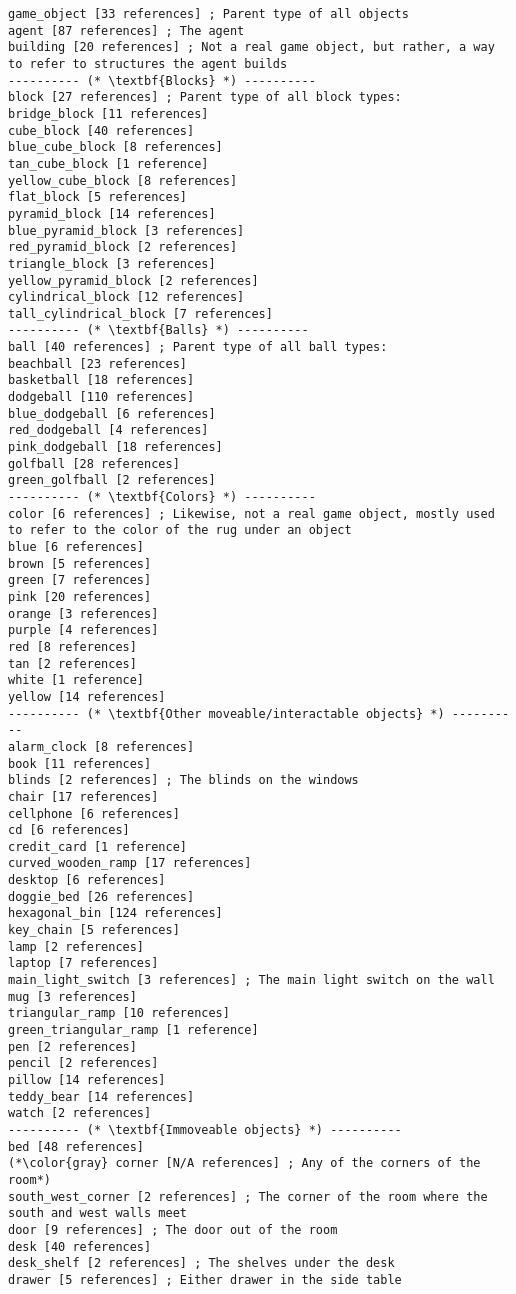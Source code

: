 \documentclass{article}
\begin{document}
\begin{lstlisting}
game_object [33 references] ; Parent type of all objects
agent [87 references] ; The agent
building [20 references] ; Not a real game object, but rather, a way to refer to structures the agent builds
---------- (* \textbf{Blocks} *) ----------
block [27 references] ; Parent type of all block types:
bridge_block [11 references] 
cube_block [40 references] 
blue_cube_block [8 references] 
tan_cube_block [1 reference] 
yellow_cube_block [8 references] 
flat_block [5 references] 
pyramid_block [14 references] 
blue_pyramid_block [3 references] 
red_pyramid_block [2 references] 
triangle_block [3 references] 
yellow_pyramid_block [2 references] 
cylindrical_block [12 references] 
tall_cylindrical_block [7 references] 
---------- (* \textbf{Balls} *) ----------
ball [40 references] ; Parent type of all ball types:
beachball [23 references] 
basketball [18 references] 
dodgeball [110 references] 
blue_dodgeball [6 references] 
red_dodgeball [4 references] 
pink_dodgeball [18 references] 
golfball [28 references] 
green_golfball [2 references] 
---------- (* \textbf{Colors} *) ----------
color [6 references] ; Likewise, not a real game object, mostly used to refer to the color of the rug under an object
blue [6 references] 
brown [5 references] 
green [7 references] 
pink [20 references] 
orange [3 references] 
purple [4 references] 
red [8 references] 
tan [2 references] 
white [1 reference] 
yellow [14 references] 
---------- (* \textbf{Other moveable/interactable objects} *) ----------
alarm_clock [8 references] 
book [11 references] 
blinds [2 references] ; The blinds on the windows
chair [17 references] 
cellphone [6 references] 
cd [6 references] 
credit_card [1 reference] 
curved_wooden_ramp [17 references] 
desktop [6 references] 
doggie_bed [26 references] 
hexagonal_bin [124 references] 
key_chain [5 references] 
lamp [2 references] 
laptop [7 references] 
main_light_switch [3 references] ; The main light switch on the wall
mug [3 references] 
triangular_ramp [10 references] 
green_triangular_ramp [1 reference] 
pen [2 references] 
pencil [2 references] 
pillow [14 references] 
teddy_bear [14 references] 
watch [2 references] 
---------- (* \textbf{Immoveable objects} *) ----------
bed [48 references] 
(*\color{gray} corner [N/A references] ; Any of the corners of the room*)
south_west_corner [2 references] ; The corner of the room where the south and west walls meet
door [9 references] ; The door out of the room
desk [40 references] 
desk_shelf [2 references] ; The shelves under the desk
drawer [5 references] ; Either drawer in the side table

\end{lstlisting}
\end{document}
